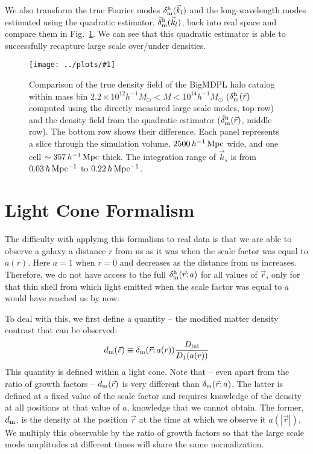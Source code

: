 \documentclass[prd,amsmath,amssymb,floatfix,superscriptaddress,nofootinbib,twocolumn]{revtex4-1}
\def\be{\begin{equation}}
\def\ee{\end{equation}}
\newcommand{\ini}{\rm ini}
\newcommand{\vrr}{\vec{r}}
\newcommand{\vk}{\vec{k}}
\newcommand{\eql}[1]{\label{eq:#1}}
\newcommand{\rf}[1]{\ref{fig:#1}}
\newcommand{\sfig}[2]{
\texttt{[image: ../plots/\#1]}
        }
\newcommand{\Sfig}[2]{
   \begin{figure}[thbp]
   \begin{center}
    \sfig{../plots/#1.pdf}{\columnwidth}
    \caption{{\small #2}}
    \label{fig:#1}
     \end{center}
   \end{figure}
}
\newcommand{\peikai}[1]{{\color{blue} #1}}
\newcommand\dmh{\delta_{\rm m}^{\rm h}}
\newcommand\hdmh{\hat{\delta}_{\rm m}^{\rm h}}
\begin{document}
We also transform the true Fourier modes $\dmh(\vk_l)$ and the long-wavelength modes estimated using the quadratic estimator, $\hdmh(\vk_l)$, back into real space and compare them in Fig.~\rf{real_snap}. We can see that this quadratic estimator is able to successfully recapture large scale over/under densities. 
 
\Sfig{real_snap}{Comparison of the true density field of the BigMDPL halo catalog within mass bin $2.2 \times 10^{12}h^{-1}M_{\odot}<M < 10^{14}h^{-1}M_{\odot}$ ($\dmh(\vrr)$ computed using the directly measured large scale modes, top row) and the density field from the quadratic estimator ($\hdmh(\vrr)$, middle row). The bottom row shows their difference. Each panel represents a slice through the simulation volume, $2500\,h^{-1}\rm \, Mpc$ wide, and one cell $\sim 357\,h^{-1}\rm \, Mpc$ thick. The integration range of $\vk_{s}$ is from $0.03\, h \rm \, Mpc^{-1}$ to $0.22\, h \rm \, Mpc^{-1}$.}

\section{Light Cone Formalism} \label{sec4}

The difficulty with applying this formalism to real data is that we are able to observe a galaxy a distance $r$ from us as it was when the scale factor was equal to $a(r)$. Here $a=1$ when $r=0$ and decreases as the distance from us increases. Therefore, we do not have access to the full $\dmh(\vec r; a)$ for all values of $\vec r$, only for that thin shell from which light emitted when the scale factor was equal to $a$ would have reached us by now.

\newcommand\dm{\delta_{\rm m}}
\newcommand\dlc{d_{\rm m}}
\newcommand\dmi{d_{\rm m,ini}}
\newcommand\dlch{d^{\rm h}_{\rm m}}
\newcommand\dolc{d^{ (1)}_{\rm m}}
\newcommand\dtlc{d^{ (2)}_{\rm m}}
To deal with this, we first define a quantity -- the modified matter density contrast that can be observed: 
\be
\dlc(\vrr) \equiv \dm(\vrr;a(r)) \frac{D_{\ini}}{D_{1}(a(r))} \eql{LC}
\ee
\peikai{This quantity is defined within a light cone.} Note that -- even apart from the ratio of growth factors -- $\dlc(\vrr)$ is very different than $\dm(\vrr; a)$. The latter is defined at a fixed value of the scale factor and requires knowledge of the density at all positions at that value of $a$, knowledge that we cannot obtain. The former, $\dlc$, is the density at the position $\vrr$ at the time at which we observe it $a(|\vrr|)$.
%
We multiply this observable by the ratio of growth factors so that the large scale mode amplitudes at different times will share the same normalization. 
\end{document}
